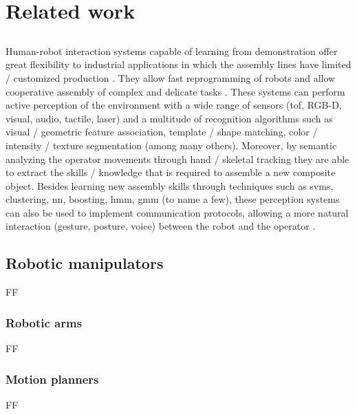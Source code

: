 \chapter{Related work}\label{chap:related-work}

\section*{}

Human-robot interaction systems capable of learning from demonstration offer great flexibility to industrial applications in which the assembly lines have limited / customized production \cite{Patel2012}. They allow fast reprogramming of robots and allow cooperative assembly of complex and delicate tasks \cite{Sumi2009,Edsinger2007}. These systems can perform active perception of the environment \cite{Yan2014,Goodrich2007} with a wide range of sensors (\gls{tof}, RGB-D, visual, audio, tactile, laser) and a multitude of recognition algorithms such as visual / geometric feature association, template / shape matching, color / intensity / texture segmentation (among many others). Moreover, by semantic analyzing the operator movements \cite{Roitberg2014} through hand / skeletal tracking they are able to extract the skills / knowledge \cite{Nikolaidis14,Goto2013} that is required to assemble a new composite object. Besides learning new assembly skills through techniques such as \glspl{svm}, clustering, \gls{nn}, boosting, \gls{hmm}, \gls{gmm} (to name a few), these perception systems can also be used to implement communication protocols, allowing a more natural interaction (gesture, posture, voice) between the robot and the operator \cite{Gleeson2013,Calisgan2012,Haddadi2013}.


\section{Robotic manipulators}

FF


\subsection{Robotic arms}

FF


\subsection{Motion planners}

FF


